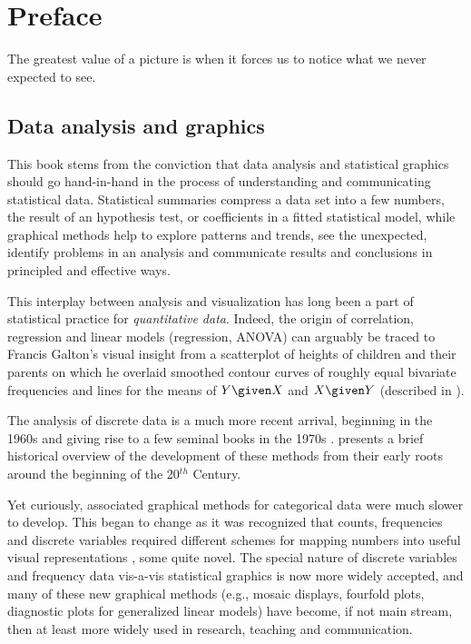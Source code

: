 \chapter*{Preface}


\epigraph{The greatest value of a picture is when it forces us to notice what we never expected to see.}{\citet[p. vi]{Tukey:77}}

\section*{Data analysis and graphics}

This book stems from the conviction that data analysis and statistical graphics should
go hand-in-hand in the process of understanding and communicating statistical data.
Statistical summaries compress a data set into a few numbers, the result of an
hypothesis test, or coefficients in a fitted statistical model,
while graphical methods help to explore patterns and trends, see the unexpected,
identify problems in an analysis and communicate results and conclusions in 
principled and effective ways. 

This interplay between analysis and visualization has long been a part of 
statistical practice for \emph{quantitative data}.  Indeed, the origin
of correlation, regression and linear models (regression, ANOVA) can
arguably be traced to Francis Galton's \citeyearpar{Galton:1886}
visual insight from a scatterplot of heights of children and their parents
on which he overlaid smoothed contour curves of roughly equal bivariate frequencies
and lines for the means of $Y \given X$ and $X \given Y$
(described in \citet{FriendlyDenis:05:scat,Friendly-etal:ellipses:2013}).

The analysis of discrete data is a much more recent arrival, beginning in the
1960s and giving rise to a few seminal books in the 1970s
\citep{Bishop-etal:75,Haberman:74, Goodman:1978,Fienberg:80}.
\citet[]{Agresti:2013} presents a brief historical overview of the
development of these methods from their early roots around the beginning
of the 20$^{th}$ Century.

Yet curiously, associated graphical methods for categorical data were 
much slower to develop. This began to change as it was recognized that
counts, frequencies and discrete variables required different
schemes for mapping numbers into useful visual representations \citep{Friendly:95,Friendly:97},
some quite novel.
The special nature of discrete variables
and frequency data vis-a-vis statistical graphics is now more widely accepted,
and many of these new graphical methods (e.g., mosaic displays, fourfold plots, diagnostic
plots for generalized linear models) have become, if not main stream, then at
least more widely used in research, teaching and communication.


